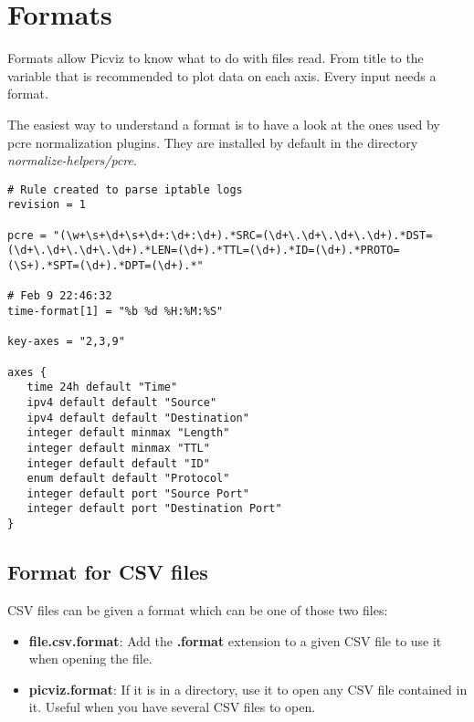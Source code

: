 \chapter{Formats}

Formats allow Picviz to know what to do with files read. From title to the variable that is recommended to plot data on each axis. Every input needs a format.

\newpage

The easiest way to understand a format is to have a look at the ones used by pcre normalization plugins. They are installed by default in the directory \textit{normalize-helpers/pcre}. 

\begin{lstlisting}
# Rule created to parse iptable logs
revision = 1

pcre = "(\w+\s+\d+\s+\d+:\d+:\d+).*SRC=(\d+\.\d+\.\d+\.\d+).*DST=(\d+\.\d+\.\d+\.\d+).*LEN=(\d+).*TTL=(\d+).*ID=(\d+).*PROTO=(\S+).*SPT=(\d+).*DPT=(\d+).*"

# Feb 9 22:46:32
time-format[1] = "%b %d %H:%M:%S"

key-axes = "2,3,9"

axes {
   time 24h default "Time"
   ipv4 default default "Source"
   ipv4 default default "Destination"
   integer default minmax "Length"
   integer default minmax "TTL"
   integer default default "ID"
   enum default default "Protocol"
   integer default port "Source Port"
   integer default port "Destination Port"
}
\end{lstlisting}

\section{Format for CSV files}
CSV files can be given a format which can be one of those two files:
\begin{itemize}
\item \textbf{file.csv.format}: Add the \textbf{.format} extension to a given CSV file to use it when opening the file.
\item \textbf{picviz.format}: If it is in a directory, use it to open any CSV file contained in it. Useful when you have several CSV files to open.
\end{itemize}
